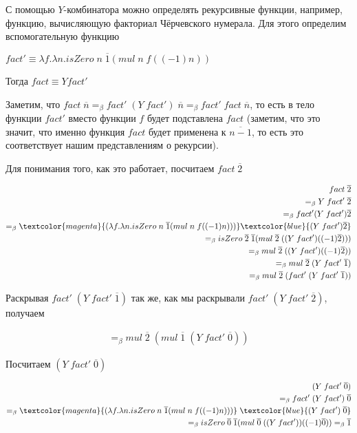 С помощью $Y$-комбинатора можно определять рекурсивные функции, например, функцию, вычисляющую факториал Чёрчевского нумерала. Для этого определим вспомогательную функцию

$fact' \equiv \lambda f. \lambda n. isZero\; n \; \overline{1} (mul \; n \; f((-1) n))$

Тогда $fact \equiv Y fact'$

Заметим, что $fact \; \overline{n} =_{\beta} fact' \; (Y \; fact') \; \overline{n} =_{\beta}fact' \; fact \; \overline{n} $, то есть в тело функции $fact'$ вместо функции $f$ будет подставлена $fact$ (заметим, что это значит, что именно функция $fact$ будет применена к $\overline{n - 1}$, то есть это соответствует нашим представлениям о рекурсии).

Для понимания того, как это работает, посчитаем $fact \; \overline{2}$

\begin{align*}
	fact \; \overline{2} \\ =_{\beta} Y \; fact' \; \overline{2}\\ =_{\beta} fact' (Y \; fact') \overline{2} \\=_{\beta}\textcolor{magenta}{(\lambda f. \lambda n. isZero\; n \; \overline{1} (mul \; n \; f((-1) n)))} \textcolor{blue}{(Y \; fact') \overline{2}} \\
	=_{\beta}isZero\; \overline{2} \; \overline{1} (mul \; \overline{2} \; ((Y \; fact')((-1) \overline{2}))) \\ =_{\beta} mul \; \overline{2} \; ((Y \; fact')((-1) \overline{2})) \\ =_{\beta} mul \; \overline{2} \; (Y \; fact' \; \overline{1}) \\ =_{\beta} mul \; \overline{2} \; (fact' \;(Y \; fact' \; \overline{1}))
\end{align*}

Раскрывая $fact' \;(Y \; fact' \; \overline{1})$ так же, как мы раскрывали  $fact' \;(Y \; fact' \; \overline{2})$, получаем

\begin{align*}
	=_{\beta} mul \; \overline{2} \; (mul \; \overline{1} \; (Y \; fact' \; \overline{0}))
\end{align*}

Посчитаем $(Y \; fact' \; \overline{0})$

\begin{align*}
	(Y \; fact' \; \overline{0}) \\ =_{\beta} fact' \; (Y \; fact') \; \overline{0} \\ =_{\beta} \textcolor{magenta}{(\lambda f. \lambda n. isZero\; n \; \overline{1} (mul \; n \; f((-1) n)))} \; \textcolor{blue}{(Y \; fact') \; \overline{0}} \\ =_{\beta}  isZero\; \overline{0} \; \overline{1} (mul \; \overline{0} \; ((Y \; fact'))((-1) \overline{0})) =_{\beta} \overline{1}
\end{align*}

